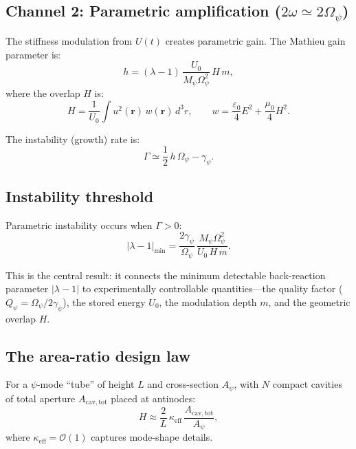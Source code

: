 \documentclass[12pt,aps,prd,twocolumn,superscriptaddress,nofootinbib]{revtex4-2}
\newcommand{\Opsi}{\Omega_\psi}
\newcommand{\gpsi}{\gamma_\psi}
\newcommand{\Mpsi}{M_\psi}
\newcommand{\Apsi}{A_\psi}
\newcommand{\keff}{\kappa_{\mathrm{eff}}}
\newcommand{\Acav}{A_{\mathrm{cav,tot}}}
\begin{document}
\subsection{Channel 2: Parametric amplification ($2\omega \simeq 2\Opsi$)}
\label{sec:channel2}

The stiffness modulation from $U(t)$ creates parametric gain.  The
Mathieu gain parameter is:
\begin{equation}
  h = (\lambda - 1)\,\frac{U_0}{\Mpsi\Opsi^2}\,H\,m,
  \label{eq:Mathieu_h}
\end{equation}
where the overlap $H$ is:
\begin{equation}
  H = \frac{1}{U_0}\int u^2(\mathbf{r})\,w(\mathbf{r})\,d^3r, \qquad
  w = \frac{\varepsilon_0}{4}E^2 + \frac{\mu_0}{4}H^2.
  \label{eq:overlap_H}
\end{equation}

The instability (growth) rate is:
\begin{equation}
\boxed{
  \Gamma \simeq \frac{1}{2}\,h\,\Opsi - \gpsi.
}
\label{eq:growth_rate}
\end{equation}

\subsection{Instability threshold}

Parametric instability occurs when $\Gamma > 0$:
\begin{equation}
  |\lambda - 1|_{\mathrm{min}} =
    \frac{2\gpsi}{\Opsi}\,\frac{\Mpsi\Opsi^2}{U_0\,H\,m}.
  \label{eq:threshold}
\end{equation}

This is the central result: it connects the minimum detectable
back-reaction parameter $|\lambda - 1|$ to experimentally controllable
quantities---the quality factor ($Q_\psi = \Opsi/2\gpsi$), the stored
energy $U_0$, the modulation depth $m$, and the geometric overlap $H$.

\subsection{The area-ratio design law}
\label{sec:area_ratio}

For a $\psi$-mode ``tube'' of height $L$ and cross-section $\Apsi$,
with $N$ compact cavities of total aperture $\Acav$ placed at antinodes:
\begin{equation}
  H \approx \frac{2}{L}\,\keff\,\frac{\Acav}{\Apsi},
  \label{eq:area_ratio}
\end{equation}
where $\keff = \mathcal{O}(1)$ captures mode-shape details.
\end{document}
